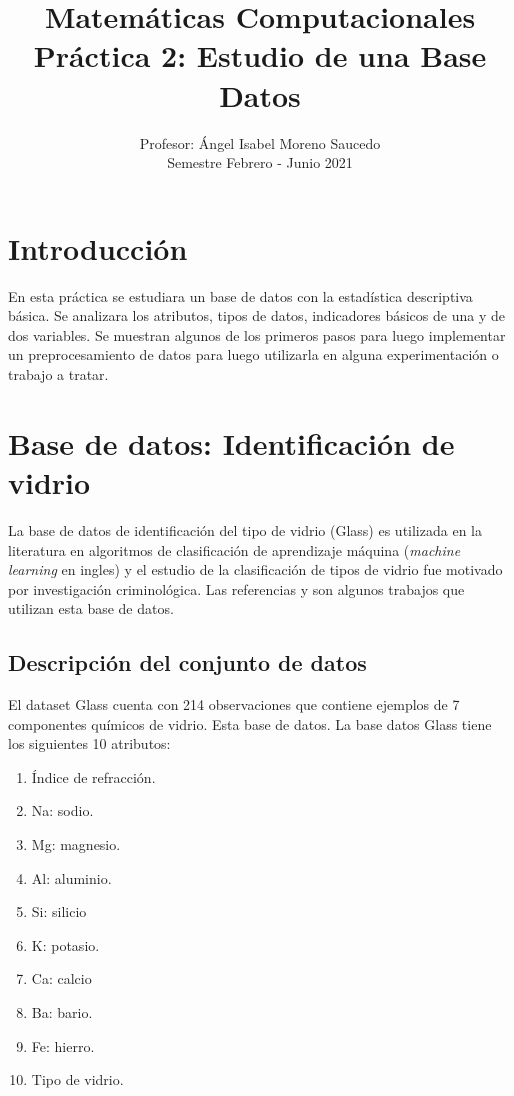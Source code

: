 
\graphicspath{{../../../matematicascomputacionales/Practica_02/figuras/}}

\title{Matemáticas Computacionales \\ Práctica 2: Estudio de una Base Datos}
\author{Profesor: Ángel Isabel Moreno Saucedo \\ Semestre Febrero - Junio 2021}
\date{}



\maketitle

\section{Introducci\'{o}n} \label{sec:intro}

En esta práctica se estudiara un base de datos con la estadística descriptiva básica. Se analizara los atributos, tipos de datos, indicadores básicos de una y de dos variables. Se muestran algunos de los primeros pasos para luego implementar un preprocesamiento de datos para luego utilizarla en alguna experimentación o trabajo a tratar.

\section{Base de datos: Identificación de vidrio} \label{sec:basededatos}

La base de datos de identificación del tipo de vidrio (Glass) es utilizada en la literatura en algoritmos de clasificación de aprendizaje máquina (\emph{machine learning} en ingles) y el estudio de la clasificación de tipos de vidrio fue motivado por investigación criminológica. Las referencias \citep{krawiec2002genetic} y \citep{zhong2007regularized} son algunos trabajos que utilizan esta base de datos.

\subsection{Descripción del conjunto de datos} \label{subsec:descripcion}
El dataset Glass cuenta con 214 observaciones que contiene ejemplos de 7 componentes químicos de vidrio. Esta base de datos. La base datos Glass tiene los siguientes 10 atributos:
\begin{enumerate}
	\item Índice de refracción.
	\item Na: sodio.
	\item Mg: magnesio.
	\item Al: aluminio.
	\item Si: silicio
	\item K: potasio.
	\item Ca: calcio
	\item Ba: bario.
	\item Fe: hierro.
	\item Tipo de vidrio.
\end{enumerate}

